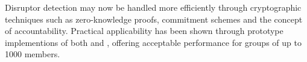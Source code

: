 Disruptor detection may now be handled more efficiently through cryptographic techniques
such as zero-knowledge proofs, commitment schemes and the concept of accountability.
Practical applicability
has been shown through prototype implementions of both \Verdict and \Dissent, offering
acceptable performance for groups of up to 1000 members.

\begin{comment}
Important points:

* Non-interactive
* Computationally/Unconditionally secure
* No central trusted party
* Shuffled send
* Security goals: integrity, anonymity, accountability (See dissent 2.3)
* Attack model (dissent 2.3)
* Assumptions, highlight difference between them (Faulty nodes never silent, ..., dissent 2.4)

Sections:

* 88: Base protocol
* 89: Disco (unconditional untraceability, computationally secure serviceability)
* 89: Waidner (Unreliable channel)
* 90: Detection of disruptors
* (03: Herbivore)
* 03: k-anonymity (maybe this is related work instead? weakens security goals to gain efficiency). Small DC subnets.
* 04: dc-revisited (proactive accountability. efficient cheater detection + recovery)
* 10: Dissent
* 13: Verdict

Definitions:

* Anonymity set
* Anonymity terms (cite def paper)
* Anonymity game (dissent [7])
* k-anonymity (k-anonymity)
* Robustness? (k-anonymity 3.3)
* (Partial, Full) Collusion
* Disruption
* Anytrust assumption
* Zero knowledge proofs

Attacks:

* Sybil (dissent [17])
* Sock puppetry (dissent [36])
* Traffic analysis (verdict [4, 34, 38])

Related work:

* Mix nets
* Crowds (dissent [29])
* CliqueNet (k-anon [17])
* Verifiable shuffles
* Group signatures, ring signatures
* Herbivore

Random notes:

* k-anonymous provide anonymity only when most members are honest (see dissent, related work)
* Herbivore provides anonymity only within small subgroups

\end{comment}
